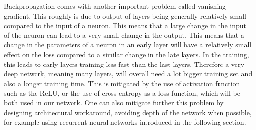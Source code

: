 Backpropagation comes with another important problem called vanishing gradient. This roughly is due to output of layers being generally relatively small compared to the input of a neuron. This means that a large change in the input of the neuron can lead to a very small change in the output. This means that a change in the parameters of a neuron in an early layer will have a relatively small effect on the loss compared to a similar change in the late layers. In the training, this leads to early layers training less fast than the last layers. Therefore a very deep network, meaning many layers, will overall need a lot bigger training set and also a longer training time. This is mitigated by the use of activation function such as the ReLU, or the use of cross-entropy as a loss function, which will be both used in our network. One can also mitigate further this problem by designing architectural workaround, avoiding depth of the network when possible, for example using recurrent neural networks introduced in the following section.

